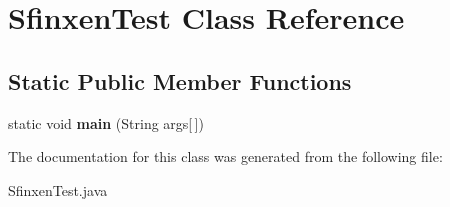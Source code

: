 \hypertarget{class_sfinxen_test}{}\section{Sfinxen\+Test Class Reference}
\label{class_sfinxen_test}
\subsection*{Static Public Member Functions}
\begin{DoxyCompactItemize}
\item 
\hypertarget{class_sfinxen_test_a3a65eaddc58d31428337f4fabd0125a2}{}static void {\bfseries main} (String args\mbox{[}$\,$\mbox{]})\label{class_sfinxen_test_a3a65eaddc58d31428337f4fabd0125a2}

\end{DoxyCompactItemize}


The documentation for this class was generated from the following file\+:\begin{DoxyCompactItemize}
\item 
Sfinxen\+Test.\+java\end{DoxyCompactItemize}
